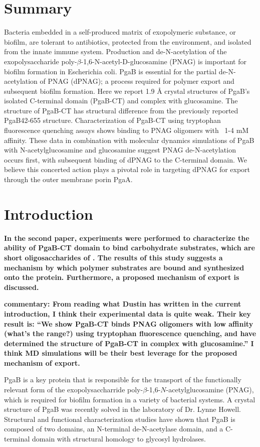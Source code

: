 \section{Summary}
Bacteria embedded in a self-produced matrix of exopolymeric substance, or biofilm, are tolerant to antibiotics, protected from the environment, and isolated from the innate immune system. Production and de-N-acetylation of the exopolysaccharide poly-$\beta$-1,6-N-acetyl-D-glucosamine (PNAG) is important for biofilm formation in Escherichia coli. PgaB is essential for the partial de-N-acetylation of PNAG (dPNAG); a process required for polymer export and subsequent biofilm formation. Here we report 1.9 Å crystal structures of PgaB’s isolated C-terminal domain (PgaB-CT) and complex with glucosamine. The structure of PgaB-CT has structural difference from the previously reported PgaB42-655 structure. Characterization of PgaB-CT using tryptophan fluorescence quenching assays shows binding to PNAG oligomers with ~1-4 mM affinity. These data in combination with molecular dynamics simulations of PgaB with N-acetylglucosamine and glucosamine suggest PNAG de-N-acetylation occurs first, with subsequent binding of dPNAG to the C-terminal domain. We believe this concerted action plays a pivotal role in targeting dPNAG for export through the outer membrane porin PgaA.

\section{Introduction}
\textbf{In the second paper, experiments were performed to characterize the ability of PgaB-CT domain to bind carbohydrate substrates, which are short oligosaccharides of \pnag. The results of this study suggests a mechanism by which polymer substrates are bound and synthesized onto the protein.  Furthermore, a proposed mechanism of export is discussed.}

\textbf{commentary: From reading what Dustin has written in the current introduction, I think their experimental data is quite weak.  Their key result is:  ``We show PgaB-CT binds PNAG oligomers with low affinity (what's the range?) using tryptophan fluorescence quenching, and have determined the structure of PgaB-CT in complex with glucosamine.'' I think MD simulations will be their best leverage for the proposed mechanism of export.}

PgaB is a key protein that is responsible for the transport of the functionally relevant form of the exopolysaccharride poly-$\beta$-1,6-$N$-acetylglucosamine (PNAG), which is required for biofilm formation in a variety of bacterial systems. A crystal structure of PgaB was recently solved in the laboratory of Dr. Lynne Howell. Structural and functional characterization studies have shown that PgaB is composed of two domains, an N-terminal de-N-acetylase domain, and a C-terminal domain with structural homology to glycosyl hydrolases.\cite{Little:2012dp}

